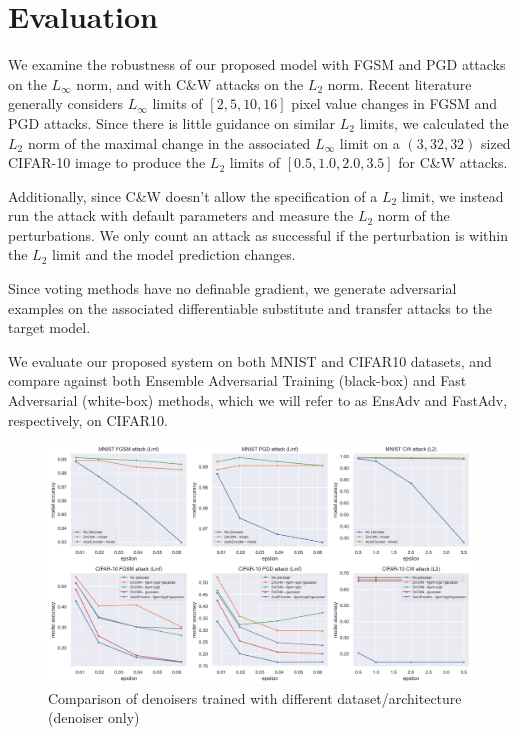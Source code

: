 \documentclass[10pt,journal,compsoc]{IEEEtran}
\begin{document}
\section{Evaluation} %
We examine the robustness of our proposed model with FGSM and PGD attacks on the $L_\infty$ norm, and with C\&W attacks on the $L_2$ norm. Recent literature generally considers $L_\infty$ limits of $[2, 5, 10, 16]$ pixel value changes in FGSM and PGD attacks. Since there is little guidance on similar $L_2$ limits, we calculated the $L_2$ norm of the maximal change in the associated $L_\infty$ limit on a $(3, 32, 32)$ sized CIFAR-10 image to produce the $L_2$ limits of $[0.5, 1.0, 2.0, 3.5]$ for C\&W attacks. 

Additionally, since C\&W doesn’t allow the specification of a $L_2$ limit, we instead run the attack with default parameters and measure the $L_2$ norm of the perturbations. We only count an attack as successful if the perturbation is within the $L_2$ limit and the model prediction changes. 

Since voting methods have no definable gradient, we generate adversarial examples on the associated differentiable substitute and transfer attacks to the target model.

We evaluate our proposed system on both MNIST and CIFAR10 datasets, and compare against both Ensemble Adversarial Training (black-box) and Fast Adversarial (white-box) methods, which we will refer to as EnsAdv and FastAdv, respectively, on CIFAR10.

\begin{figure}[!h]
\centering
    \includegraphics[width=1.8\columnwidth]{images/denoiser_only_result.png}
    \caption{Comparison of denoisers trained with different dataset/architecture (denoiser only)}
    \label{fig:denoisercomp}
\end{figure}
\end{document}
